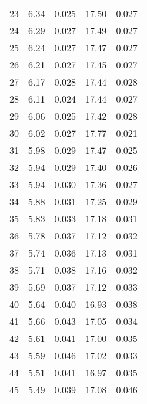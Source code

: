 \begin{table}
\begin{tabular}{c|ll|ll}
23 & 6.34 & 0.025 & 17.50 & 0.027 \\
24 & 6.29 & 0.027 & 17.49 & 0.027 \\
25 & 6.24 & 0.027 & 17.47 & 0.027 \\
26 & 6.21 & 0.027 & 17.45 & 0.027 \\
27 & 6.17 & 0.028 & 17.44 & 0.028 \\
28 & 6.11 & 0.024 & 17.44 & 0.027 \\
29 & 6.06 & 0.025 & 17.42 & 0.028 \\
30 & 6.02 & 0.027 & 17.77 & 0.021 \\
31 & 5.98 & 0.029 & 17.47 & 0.025 \\
32 & 5.94 & 0.029 & 17.40 & 0.026 \\
33 & 5.94 & 0.030 & 17.36 & 0.027 \\
34 & 5.88 & 0.031 & 17.25 & 0.029 \\
35 & 5.83 & 0.033 & 17.18 & 0.031 \\
36 & 5.78 & 0.037 & 17.12 & 0.032 \\
37 & 5.74 & 0.036 & 17.13 & 0.031 \\
38 & 5.71 & 0.038 & 17.16 & 0.032 \\
39 & 5.69 & 0.037 & 17.12 & 0.033 \\
40 & 5.64 & 0.040 & 16.93 & 0.038 \\
41 & 5.66 & 0.043 & 17.05 & 0.034 \\
42 & 5.61 & 0.041 & 17.00 & 0.035 \\
43 & 5.59 & 0.046 & 17.02 & 0.033 \\
44 & 5.51 & 0.041 & 16.97 & 0.035 \\
45 & 5.49 & 0.039 & 17.08 & 0.046 \\
               \hline
        \end{tabular}
    \end{table}
    \clearpage

